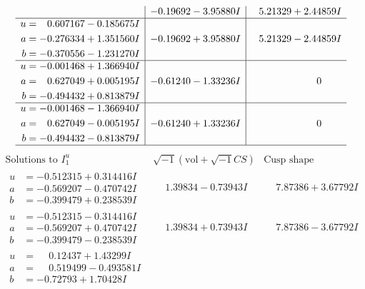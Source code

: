 \documentclass[1p]{elsarticle_modified}
\theoremstyle{definition}
\newcommand{\I}{\sqrt{-1}}
\begin{document}
$$\begin{array}{c|c|c}
 & -0.19692 - 3.95880 I & \phantom{-}5.21329 + 2.44859 I \\ \hline\begin{aligned}
u &= \phantom{-}0.607167 - 0.185675 I \\
a &= -0.276334 + 1.351560 I \\
b &= -0.370556 - 1.231270 I\end{aligned}
 & -0.19692 + 3.95880 I & \phantom{-}5.21329 - 2.44859 I \\ \hline\begin{aligned}
u &= -0.001468 + 1.366940 I \\
a &= \phantom{-}0.627049 + 0.005195 I \\
b &= -0.494432 + 0.813879 I\end{aligned}
 & -0.61240 - 1.33236 I & \phantom{-0.000000 } 0 \\ \hline\begin{aligned}
u &= -0.001468 - 1.366940 I \\
a &= \phantom{-}0.627049 - 0.005195 I \\
b &= -0.494432 - 0.813879 I\end{aligned}
 & -0.61240 + 1.33236 I & \phantom{-0.000000 } 0\\
 \hline 
 \end{array}$$\newpage$$\begin{array}{c|c|c}  
\text{Solutions to }I^u_{1}& \I (\text{vol} + \sqrt{-1}CS) & \text{Cusp shape}\\
 \hline 
\begin{aligned}
u &= -0.512315 + 0.314416 I \\
a &= -0.569207 - 0.470742 I \\
b &= -0.399479 + 0.238539 I\end{aligned}
 & \phantom{-}1.39834 - 0.73943 I & \phantom{-}7.87386 + 3.67792 I \\ \hline\begin{aligned}
u &= -0.512315 - 0.314416 I \\
a &= -0.569207 + 0.470742 I \\
b &= -0.399479 - 0.238539 I\end{aligned}
 & \phantom{-}1.39834 + 0.73943 I & \phantom{-}7.87386 - 3.67792 I \\ \hline\begin{aligned}
u &= \phantom{-}0.12437 + 1.43299 I \\
a &= \phantom{-}0.519499 - 0.493581 I \\
b &= -0.72793 + 1.70428 I\end{aligned}

\end{array}$$
\end{document}
